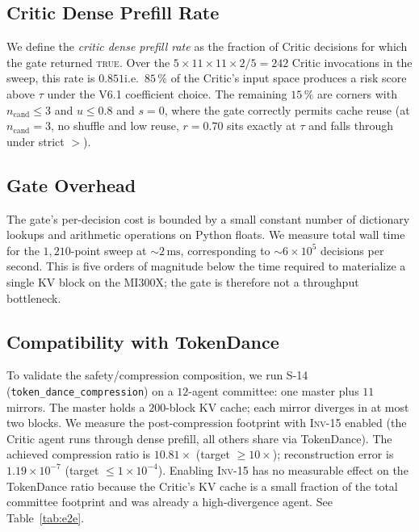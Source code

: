 \documentclass[10pt,twocolumn]{article}
\newcommand{\INV}[1]{\textsc{Inv-#1}}
\newcommand{\Cand}{n_{\text{cand}}}
\newcommand{\Reuse}{u}
\newcommand{\Shuf}{s}
\newcommand{\code}[1]{\texttt{\small #1}}
\begin{document}
\subsection{Critic Dense Prefill Rate}
\label{sec:eval:critic}

We define the \emph{critic dense prefill rate} as the fraction of
Critic decisions for which the gate returned \textsc{true}. Over the
$5 \times 11 \times 11 \times 2 / 5 = 242$ Critic invocations in the
sweep, this rate is $0.851$\textemdash i.e.\ $85\,\%$ of the Critic's
input space produces a risk score above $\tau$ under the V6.1
coefficient choice. The remaining $15\,\%$ are corners with
$\Cand \leq 3$ and $\Reuse \leq 0.8$ and $\Shuf = 0$, where the gate
correctly permits cache reuse (at $\Cand = 3$, no shuffle and low reuse,
$r = 0.70$ sits exactly at $\tau$ and falls through under strict $>$).

\subsection{Gate Overhead}
\label{sec:eval:overhead}

The gate's per-decision cost is bounded by a small constant number of
dictionary lookups and arithmetic operations on Python floats. We
measure total wall time for the $1{,}210$-point sweep at $\sim\!2\,\mathrm{ms}$,
corresponding to $\sim\!6 \times 10^{5}$ decisions per second. This is
five orders of magnitude below the time required to materialize a
single KV block on the MI300X; the gate is therefore not a throughput
bottleneck.

\subsection{Compatibility with TokenDance}
\label{sec:eval:tokendance}

To validate the safety/compression composition, we run S-14
(\code{token\_dance\_compression}) on a $12$-agent committee: one master
plus $11$ mirrors. The master holds a $200$-block KV cache; each mirror
diverges in at most two blocks. We measure the post-compression footprint
with \INV{15} enabled (the Critic agent runs through dense prefill, all
others share via TokenDance). The achieved compression ratio is
$\mathbf{10.81\times}$ (target $\geq 10\times$); reconstruction error is
$1.19 \times 10^{-7}$ (target $\leq 1 \times 10^{-4}$). Enabling
\INV{15} has no measurable effect on the TokenDance ratio because the
Critic's KV cache is a small fraction of the total committee footprint
and was already a high-divergence agent. See Table~\ref{tab:e2e}.
\end{document}
